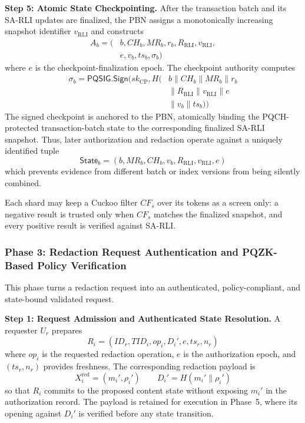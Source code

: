 \documentclass[lettersize,journal]{IEEEtran}
\begin{document}
\medskip
\noindent\textbf{Step 5: Atomic State Checkpointing.}
After the transaction batch and its SA-RLI updates are finalized, the
PBN assigns a monotonically increasing snapshot identifier
$v_{\mathrm{RLI}}$ and constructs
\begin{equation}
\begin{aligned}
A_b=\big(&b,CH_b,MR_b,r_b,R_{\mathrm{RLI}},
v_{\mathrm{RLI}},\\
& e,v_b,ts_b,\sigma_b\big)
\end{aligned}
\end{equation}
where $e$ is the checkpoint-finalization epoch. The checkpoint authority
computes
\begin{equation}
\begin{aligned}
\sigma_b=
\mathsf{PQSIG.Sign}\big(
sk_{\mathrm{CP}},
H(&b\parallel CH_b\parallel MR_b\parallel r_b\\
&\parallel R_{\mathrm{RLI}}\parallel v_{\mathrm{RLI}}
\parallel e\\
&\parallel v_b\parallel ts_b)\big)
\end{aligned}
\end{equation}
The signed checkpoint is anchored to the PBN, atomically binding the
PQCH-protected transaction-batch state to the corresponding finalized
SA-RLI snapshot. Thus, later authorization and redaction operate against
a uniquely identified tuple
\begin{equation}
\mathsf{State}_b=
(b,MR_b,CH_b,v_b,R_{\mathrm{RLI}},v_{\mathrm{RLI}},e)
\end{equation}
which prevents evidence from different batch or index versions from
being silently combined.

Each shard may keep a Cuckoo filter $CF_s$ over its tokens as a
screen only: a negative result is trusted only when $CF_s$ matches the
finalized snapshot, and every positive result is verified against
SA-RLI.    
    
   \subsubsection*{\textbf{Phase 3: Redaction Request Authentication and
PQZK-Based Policy Verification}}

This phase turns a redaction request into an authenticated,
policy-compliant, and state-bound validated request.

\medskip
\noindent\textbf{Step 1: Request Admission and Authenticated State
Resolution.}
A requester $U_r$ prepares
\begin{equation}
R_i=(ID_r,TID_i,op_i,D_i',e,ts_r,n_r)
\end{equation}
where $op_i$ is the requested redaction operation, $e$ is the
authorization epoch, and $(ts_r,n_r)$ provides freshness. The
corresponding redaction payload is
\begin{equation}
X_i^{\mathrm{red}}=(m_i',\rho_i')
\qquad
D_i'=H(m_i'\parallel\rho_i')
\end{equation}
so that $R_i$ commits to the proposed content state without exposing
$m_i'$ in the authorization record. The payload is retained for
execution in Phase~5, where its opening against $D_i'$ is verified
before any state transition.
\end{document}
